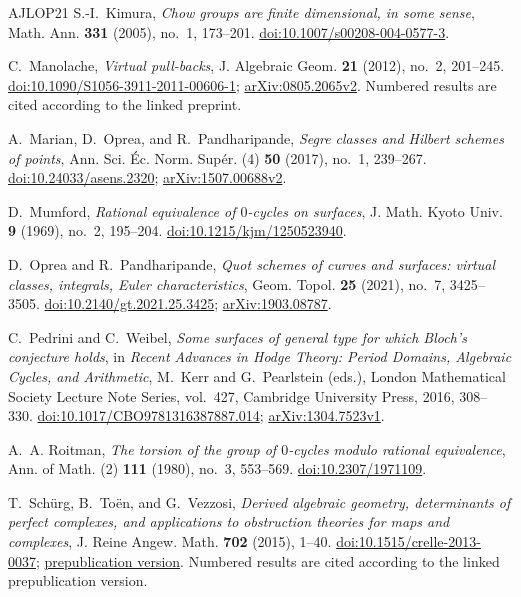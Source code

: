 \begin{thebibliography}{AJLOP21}
S.-I.~Kimura,
\emph{Chow groups are finite dimensional, in some sense},
Math. Ann. \textbf{331} (2005), no.~1, 173--201.
\href{https://doi.org/10.1007/s00208-004-0577-3}{doi:10.1007/s00208-004-0577-3}.

C.~Manolache, \emph{Virtual pull-backs},
J. Algebraic Geom. \textbf{21} (2012), no.~2, 201--245.
\href{https://doi.org/10.1090/S1056-3911-2011-00606-1}{doi:10.1090/S1056-3911-2011-00606-1};
\href{https://arxiv.org/abs/0805.2065v2}{arXiv:0805.2065v2}.
Numbered results are cited according to the linked preprint.

A.~Marian, D.~Oprea, and R.~Pandharipande,
\emph{Segre classes and Hilbert schemes of points},
Ann. Sci. \'Ec. Norm. Sup\'er. (4) \textbf{50} (2017), no.~1, 239--267.
\href{https://doi.org/10.24033/asens.2320}{doi:10.24033/asens.2320};
\href{https://arxiv.org/abs/1507.00688v2}{arXiv:1507.00688v2}.

D.~Mumford, \emph{Rational equivalence of $0$-cycles on surfaces},
J. Math. Kyoto Univ. \textbf{9} (1969), no.~2, 195--204.
\href{https://doi.org/10.1215/kjm/1250523940}{doi:10.1215/kjm/1250523940}.

D.~Oprea and R.~Pandharipande,
\emph{Quot schemes of curves and surfaces: virtual classes, integrals, Euler characteristics},
Geom. Topol. \textbf{25} (2021), no.~7, 3425--3505.
\href{https://doi.org/10.2140/gt.2021.25.3425}{doi:10.2140/gt.2021.25.3425};
\href{https://arxiv.org/abs/1903.08787}{arXiv:1903.08787}.

C.~Pedrini and C.~Weibel,
\emph{Some surfaces of general type for which Bloch's conjecture holds},
in \emph{Recent Advances in Hodge Theory: Period Domains, Algebraic Cycles,
and Arithmetic}, M.~Kerr and G.~Pearlstein (eds.),
London Mathematical Society Lecture Note Series, vol.~427,
Cambridge University Press, 2016, 308--330.
\href{https://doi.org/10.1017/CBO9781316387887.014}{doi:10.1017/CBO9781316387887.014};
\href{https://arxiv.org/abs/1304.7523v1}{arXiv:1304.7523v1}.

A.~A. Roitman,
\emph{The torsion of the group of $0$-cycles modulo rational equivalence},
Ann. of Math. (2) \textbf{111} (1980), no.~3, 553--569.
\href{https://doi.org/10.2307/1971109}{doi:10.2307/1971109}.

T.~Sch\"urg, B.~To\"en, and G.~Vezzosi,
\emph{Derived algebraic geometry, determinants of perfect complexes,
and applications to obstruction theories for maps and complexes},
J. Reine Angew. Math. \textbf{702} (2015), 1--40.
\href{https://doi.org/10.1515/crelle-2013-0037}{doi:10.1515/crelle-2013-0037};
\href{https://flore.unifi.it/bitstream/2158/800683/1/crelle.pdf}{prepublication version}.
Numbered results are cited according to the linked prepublication version.


\end{thebibliography}
